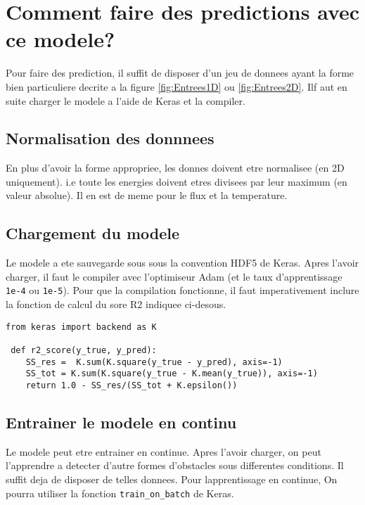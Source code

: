 

\chapter{Comment faire des predictions avec ce modele?} %

\label{AppendixB} %
Pour faire des prediction, il suffit de disposer d'un jeu de donnees ayant la forme bien particuliere decrite a la figure \ref{fig:Entrees1D} ou \ref{fig:Entrees2D}. Ilf aut en suite charger le modele a l'aide de Keras et la compiler.

\section{Normalisation des donnnees}
En plus d'avoir la forme appropriee, les donnes doivent etre normalisee (en 2D uniquement). i.e toute les energies doivent etres divisees par leur maximum (en valeur absolue). Il en est de meme pour le flux et la temperature.

\section{Chargement du modele}
Le modele a ete sauvegarde sous sous la convention HDF5 de Keras. Apres l'avoir charger, il faut le compiler avec l'optimiseur Adam (et le taux d'apprentissage \verb|1e-4| ou \verb|1e-5|). Pour que la compilation fonctionne, il faut imperativement inclure la fonction de calcul du sore R2 indiquee ci-desous.

\begin{verbatim}
from keras import backend as K

 def r2_score(y_true, y_pred):
    SS_res =  K.sum(K.square(y_true - y_pred), axis=-1) 
    SS_tot = K.sum(K.square(y_true - K.mean(y_true)), axis=-1)
    return 1.0 - SS_res/(SS_tot + K.epsilon())
\end{verbatim}


\section{Entrainer le modele en continu}
Le modele peut etre entrainer en continue. Apres l'avoir charger, on peut l'apprendre a detecter d'autre formes d'obstacles sous differentes conditions. Il suffit deja de disposer de telles donnees. Pour lapprentissage en continue, On pourra utiliser la fonction \verb|train_on_batch| de Keras.

